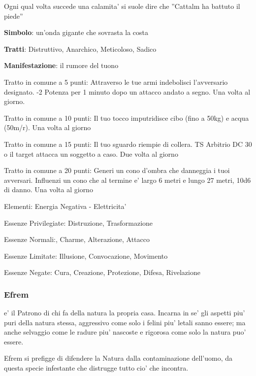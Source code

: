 \documentclass[a4paper,11pt,twoside,openany]{book}
\begin{document}
{		Ogni qual volta succede una calamita' si suole dire che ''Cattalm ha battuto il piede''
		
		\textbf{Simbolo}: un'onda gigante che sovrasta la costa
		
		\textbf{Tratti}: Distruttivo, Anarchico, Meticoloso, Sadico
		
		\textbf{Manifestazione}: il rumore del tuono
		
		\bigskip
		
		Tratto in comune a 5 punti: Attraverso le tue armi indebolisci l'avversario designato. -2 Potenza per 1 minuto dopo un attacco andato a segno. Una volta al giorno.
		
		Tratto in comune a 10 punti: Il tuo tocco imputridisce cibo (fino a 50kg) e acqua (50m/r). Una volta al giorno
		
		Tratto in comune a 15 punti: Il tuo sguardo riempie di collera. TS Arbitrio DC 30 o il target attacca un soggetto a caso. Due volta al giorno
		
		Tratto in comune a 20 punti: Generi un cono d'ombra che danneggia i tuoi avversari. Influenzi un cono che al termine e' largo 6 metri e lungo 27 metri, 10d6 di danno. Una volta al giorno
		
		\bigskip
		
		Elementi: Energia Negativa - Elettricita'
		
		\bigskip
		
		Essenze Privilegiate: Distruzione, Trasformazione
		
		Essenze Normali:, Charme, Alterazione, Attacco
		
		Essenze Limitate: Illusione, Convocazione, Movimento
		
		Essenze Negate: Cura, Creazione, Protezione, Difesa, Rivelazione
		
		\subsubsection{Efrem}
		
		\label{efrem}
		
		e' il Patrono di chi fa della natura la propria casa. Incarna in se' gli aspetti piu' puri della natura stessa, aggressivo come solo i felini piu' letali sanno essere; ma anche selvaggio come le radure piu' nascoste e rigorosa come solo la natura puo' essere.
		
		Efrem si prefigge di difendere la Natura dalla contaminazione dell'uomo, da questa specie infestante che distrugge tutto cio' che incontra.
		
}
\end{document}
